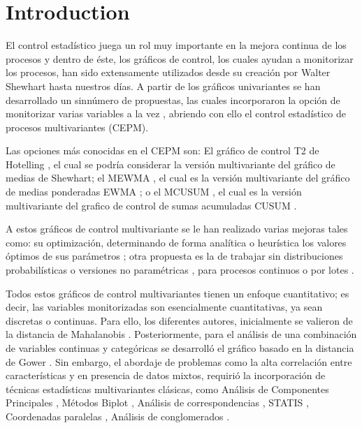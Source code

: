 \documentclass[mathematics,article,submit,moreauthors,pdftex]{mdpi}
\begin{document}

\hypertarget{introduction}{%
\section{Introduction}\label{introduction}}

El control estadístico juega un rol muy importante en la mejora continua
de los procesos y dentro de éste, los gráficos de control, los cuales
ayudan a monitorizar los procesos, han sido extensamente utilizados
desde su creación por Walter Shewhart \citep{Gutierrez2013} hasta
nuestros días. A partir de los gráficos univariantes se han desarrollado
un sinnúmero de propuestas, las cuales incorporaron la opción de
monitorizar varias variables a la vez \citep{ramos2017, li2012},
abriendo con ello el control estadístico de procesos multivariantes
(CEPM).

Las opciones más conocidas en el CEPM son: El gráfico de control T2 de
Hotelling \citep{hotelling1947}, el cual se podría considerar la versión
multivariante del gráfico de medias de Shewhart; el MEWMA
\citep{lowry1992}, el cual es la versión multivariante del gráfico de
medias ponderadas EWMA \citep{roberts2000control}; o el MCUSUM
\citep{Crosier1988}, el cual es la versión multivariante del grafico de
control de sumas acumuladas CUSUM \citep{page1954continuous}.

A estos gráficos de control multivariante se le han realizado varias
mejoras tales como: su optimización, determinando de forma analítica
\citep{Aparisi1996, Aparisi2001, Faraz2006} o heurística los valores
óptimos de sus parámetros \citep{ruiz2013}; otra propuesta es la de
trabajar sin distribuciones probabilísticas o versiones no paramétricas
\citep{shabbak2012, liu2020, xue2020}, para procesos continuos o por
lotes \citep{ramos2017}.

Todos estos gráficos de control multivariantes tienen un enfoque
cuantitativo; es decir, las variables monitorizadas son esencialmente
cuantitativas, ya sean discretas o continuas. Para ello, los diferentes
autores, inicialmente se valieron de la distancia de Mahalanobis
\citep{mahalanobis1936generalised}. Posteriormente, para el análisis de
una combinación de variables continuas y categóricas se desarrolló el
gráfico basado en la distancia de Gower \citep{Tuerhong2014}. Sin
embargo, el abordaje de problemas como la alta correlación entre
características y en presencia de datos mixtos, requirió la
incorporación de técnicas estadísticas multivariantes clásicas, como
Análisis de Componentes Principales \citep{pearson1901liii}, Métodos
Biplot \citep{gabriel1971biplot, galindojk}, Análisis de
correspondencias \citep{Benzecri}, STATIS
\citep{l1976structuration, robert1976unifying, lavit1988presentation},
Coordenadas paralelas \citep{inselberg1990parallel}, Análisis de
conglomerados \citep{edwards1965method}.
\end{document}
